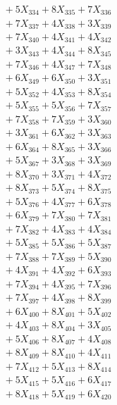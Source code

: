 \documentclass[a4paper,10pt]{article}
\begin{document}
{\begin{align}
&\;  + 5 X_{334} + 8 X_{335} + 7 X_{336} \\[0.3ex]
&\;  + 7 X_{337} + 4 X_{338} + 3 X_{339} \\[0.5ex]\allowbreak
&\;  + 7 X_{340} + 4 X_{341} + 4 X_{342} \\[0.3ex]
&\;  + 3 X_{343} + 4 X_{344} + 8 X_{345} \\[0.3ex]
&\;  + 7 X_{346} + 4 X_{347} + 7 X_{348} \\[0.3ex]
&\;  + 6 X_{349} + 6 X_{350} + 3 X_{351} \\[0.3ex]
&\;  + 5 X_{352} + 4 X_{353} + 8 X_{354} \\[0.3ex]
&\;  + 5 X_{355} + 5 X_{356} + 7 X_{357} \\[0.3ex]
&\;  + 7 X_{358} + 7 X_{359} + 3 X_{360} \\[0.3ex]
&\;  + 3 X_{361} + 6 X_{362} + 3 X_{363} \\[0.3ex]
&\;  + 6 X_{364} + 8 X_{365} + 3 X_{366} \\[0.3ex]
&\;  + 5 X_{367} + 3 X_{368} + 3 X_{369} \\[0.5ex]\allowbreak
&\;  + 8 X_{370} + 3 X_{371} + 4 X_{372} \\[0.3ex]
&\;  + 8 X_{373} + 5 X_{374} + 8 X_{375} \\[0.3ex]
&\;  + 5 X_{376} + 4 X_{377} + 6 X_{378} \\[0.3ex]
&\;  + 6 X_{379} + 7 X_{380} + 7 X_{381} \\[0.3ex]
&\;  + 7 X_{382} + 4 X_{383} + 4 X_{384} \\[0.3ex]
&\;  + 5 X_{385} + 5 X_{386} + 5 X_{387} \\[0.3ex]
&\;  + 7 X_{388} + 7 X_{389} + 5 X_{390} \\[0.3ex]
&\;  + 4 X_{391} + 4 X_{392} + 6 X_{393} \\[0.3ex]
&\;  + 7 X_{394} + 4 X_{395} + 7 X_{396} \\[0.3ex]
&\;  + 7 X_{397} + 4 X_{398} + 8 X_{399} \\[0.5ex]\allowbreak
&\;  + 6 X_{400} + 8 X_{401} + 5 X_{402} \\[0.3ex]
&\;  + 4 X_{403} + 8 X_{404} + 3 X_{405} \\[0.3ex]
&\;  + 5 X_{406} + 8 X_{407} + 4 X_{408} \\[0.3ex]
&\;  + 8 X_{409} + 8 X_{410} + 4 X_{411} \\[0.3ex]
&\;  + 7 X_{412} + 5 X_{413} + 8 X_{414} \\[0.3ex]
&\;  + 5 X_{415} + 5 X_{416} + 6 X_{417} \\[0.3ex]
&\;  + 8 X_{418} + 5 X_{419} + 6 X_{420} \\[0.3ex]

\end{align}}
\end{document}
